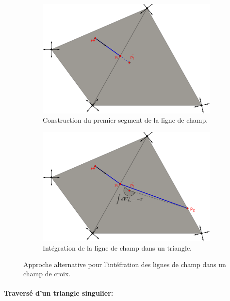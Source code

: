 \begin{figure}[!h]
     \centering
     \begin{subfigure}[b]{0.7\textwidth}
         \centering
         \includegraphics[width=\textwidth]{images/draw_streams_21.pdf}
         \caption{Construction du premier segment de la ligne de champ.}
     \end{subfigure}
     \begin{subfigure}[b]{0.7\textwidth}
         \centering
         \includegraphics[width=\textwidth]{images/draw_streams_22.pdf}
         \caption{Intégration de la ligne de champ dans un triangle.}
     \end{subfigure}
        \caption{Approche alternative pour l'intéfration des lignes de champ dans un champ de croix.}
        \label{fig:draw_streams_2}
\end{figure}

\paragraph{Traversé d'un triangle singulier:}

